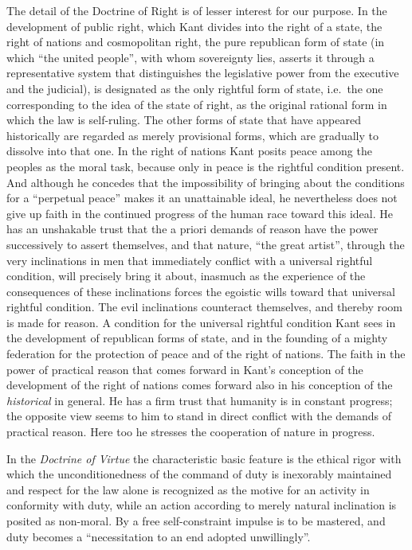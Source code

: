 The detail of the Doctrine of Right is of lesser interest for our
purpose. In the development of public right, which Kant
divides into the right of a state, the right of nations and
cosmopolitan right, the pure republican form of state (in which ``the
united people'', with whom sovereignty lies, asserts it through a
representative system that distinguishes the legislative power from the
executive and the judicial), is designated as the only rightful form of
state, i.e.\ the one corresponding to the idea of the state of right, as
the original rational form in which the law is self-ruling. The other
forms of state that have appeared historically are regarded as merely
provisional forms, which are gradually to dissolve into that one. In the
right of nations Kant posits peace among the peoples as the moral task,
because only in peace is the rightful condition present. And although he
concedes that the impossibility of bringing about the conditions for a
``perpetual peace'' makes it an unattainable ideal, he nevertheless does
not give up faith in the continued progress of the human race toward
this ideal. He has an unshakable trust that the a priori demands of
reason have the power successively to assert themselves, and that
nature, ``the great artist'', through the very inclinations in men that
immediately conflict with a universal rightful condition, will precisely
bring it about, inasmuch as the experience of the consequences of these
inclinations forces the egoistic wills toward that universal rightful
condition. The evil inclinations counteract themselves, and thereby room
is made for reason. A condition for the universal rightful condition
Kant sees in the development of republican forms of state, and in the
founding of a mighty federation for the protection of peace and of the
right of nations. The faith in the power of practical reason that comes
forward in Kant's conception of the development of the right of nations
comes forward also in his conception of the \emph{historical} in
general. He has a firm trust that humanity is in constant progress; the
opposite view seems to him to stand in direct conflict with the demands
of practical reason. Here too he stresses the cooperation of nature in
progress.

In the \emph{Doctrine of Virtue} the characteristic basic feature is the
ethical rigor with which the unconditionedness of the command of duty is
inexorably maintained and respect for the law alone is
recognized as the motive for an activity in conformity with duty, while
an action according to merely natural inclination is posited as
non-moral. By a free self-constraint impulse is to be mastered, and duty
becomes a ``necessitation to an end adopted unwillingly''.

